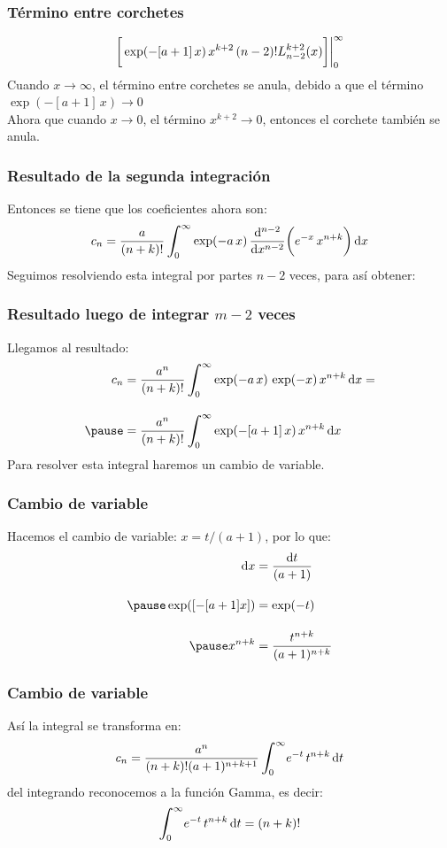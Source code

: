 \documentclass[12pt]{beamer}
\begin{document}
\begin{frame}
\frametitle{Término entre corchetes}
\begin{align*}
\bigg[ \exp(-[a + 1] \, x) \, x^{k+2} \, (n - 2)! \scaleto{L_{n-2}^{k+2}(x)}{3ex} \bigg] \bigg\vert_{0}^{\infty}
\end{align*}
\pause
Cuando $x \to \infty$, el término entre corchetes se anula, debido a que el término $\exp(-[a + 1] \, x) \to 0$
\\
\bigskip
\pause
Ahora que cuando $x \to 0$, el término $x^{k+2} \to  0$, entonces el corchete también se anula.
\end{frame}    
\begin{frame}
\frametitle{Resultado de la segunda integración}
Entonces se tiene que los coeficientes ahora son:
\pause
\begin{align*}
c_{n} = \dfrac{a}{(n + k)!} \, \scaleint{6ex}_{\bs 0}^{\infty} \exp( - a \, x) \, \dv[n-2]{x} \bigg( e^{-x} \, x^{n+k} \bigg) \dd{x}
\end{align*}
\pause
Seguimos resolviendo esta integral por partes $n - 2$ veces, para así obtener:
\end{frame}
\begin{frame}
\frametitle{Resultado luego de integrar $m-2$ veces}
Llegamos al resultado:
\pause
\begin{eqnarray*}
\begin{aligned}
c_{n} &= \dfrac{a^{n}}{(n + k)!} \, \scaleint{6ex}_{\bs 0}^{\infty} \exp( - a \, x) \, \exp(-x) \, x^{n+k} \dd{x} = \\[1em] \pause
&= \dfrac{a^{n}}{(n + k)!} \, \scaleint{6ex}_{\bs 0}^{\infty} \exp(-[a + 1] \, x) \, x^{n+k} \dd{x}
\end{aligned}
\end{eqnarray*}
\pause
Para resolver esta integral haremos un cambio de variable.
\end{frame}
\begin{frame}
\frametitle{Cambio de variable}
Hacemos el cambio de variable: $x = t / (a + 1)$, por lo que:
\pause
\begin{eqnarray*}
\begin{aligned}
\dd{x} &= \dfrac{\dd{t}}{(a + 1)} \\[1em] \pause
\exp([-[a + 1] x]) &= \exp(-t) \\[1em] \pause
x^{n+k} &= \dfrac{t^{n+k}}{(a + 1)^{n+k}}
\end{aligned}
\end{eqnarray*}
\end{frame}
\begin{frame}
\frametitle{Cambio de variable}
Así la integral se transforma en:
\pause
\begin{align*}
c_{n} = \dfrac{a^{n}}{(n + k)! (a + 1)^{n+k+1}} \, \scaleint{6ex}_{\bs 0}^{\infty} e^{-t} \, t^{n+k} \dd{t}
\end{align*}
\pause
del integrando reconocemos a la función Gamma, es decir:
\pause
\begin{align*}
\scaleint{6ex}_{\bs 0}^{\infty} e^{-t} \, t^{n+k} \dd{t} = (n + k)!
\end{align*}
\end{frame}
\end{document}
